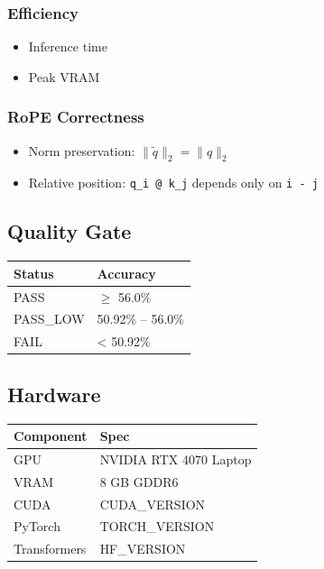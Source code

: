 \subsubsection{Efficiency}
\begin{itemize}
\item Inference time
\item Peak VRAM

\end{itemize}
\subsubsection{RoPE Correctness}
\begin{itemize}
\item Norm preservation: $\|\tilde{q}\|_2 = \|q\|_2$
\item Relative position: \texttt{q\_i @ k\_j} depends only on \texttt{i - j}

\end{itemize}
\subsection{Quality Gate}

\begin{table}[H]
\centering
\small
\begin{tabular}{ll}
\toprule
\textbf{Status} & \textbf{Accuracy} \\
\midrule
PASS & $\ge$ 56.0\% \\
PASS\_LOW & 50.92\% -- 56.0\% \\
FAIL & < 50.92\% \\
\bottomrule
\end{tabular}
\end{table}

\subsection{Hardware}

\begin{table}[H]
\centering
\small
\begin{tabular}{ll}
\toprule
\textbf{Component} & \textbf{Spec} \\
\midrule
GPU & NVIDIA RTX 4070 Laptop \\
VRAM & 8 GB GDDR6 \\
CUDA & {{CUDA\_VERSION}} \\
PyTorch & {{TORCH\_VERSION}} \\
Transformers & {{HF\_VERSION}} \\
\bottomrule
\end{tabular}
\end{table}

